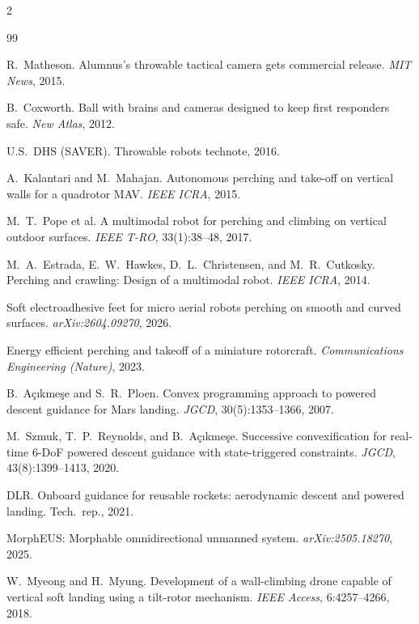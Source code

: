 \documentclass[11pt]{article}
\begin{document}
\scriptsize
\begin{multicols}{2}
\begin{thebibliography}{99}
\setlength\itemsep{-2pt}
\setlength\parskip{0pt}

 R.~Matheson. Alumnus's throwable tactical camera gets commercial release. \emph{MIT News}, 2015.

 B.~Coxworth. Ball with brains and cameras designed to keep first responders safe. \emph{New Atlas}, 2012.

 U.S.\ DHS (SAVER). Throwable robots technote, 2016.

 A.~Kalantari and M.~Mahajan. Autonomous perching and take-off on vertical walls for a quadrotor MAV. \emph{IEEE ICRA}, 2015.

 M.~T.~Pope et al. A multimodal robot for perching and climbing on vertical outdoor surfaces. \emph{IEEE T-RO}, 33(1):38--48, 2017.

 M.~A.~Estrada, E.~W.~Hawkes, D.~L.~Christensen, and M.~R.~Cutkosky. Perching and crawling: Design of a multimodal robot. \emph{IEEE ICRA}, 2014.

 Soft electroadhesive feet for micro aerial robots perching on smooth and curved surfaces. \emph{arXiv:2604.09270}, 2026.

 Energy efficient perching and takeoff of a miniature rotorcraft. \emph{Communications Engineering (Nature)}, 2023.

 B.~A\c{c}{\i}kme\c{s}e and S.~R.~Ploen. Convex programming approach to powered descent guidance for Mars landing. \emph{JGCD}, 30(5):1353--1366, 2007.

 M.~Szmuk, T.~P.~Reynolds, and B.~A\c{c}{\i}kme\c{s}e. Successive convexification for real-time 6-DoF powered descent guidance with state-triggered constraints. \emph{JGCD}, 43(8):1399--1413, 2020.

 DLR. Onboard guidance for reusable rockets: aerodynamic descent and powered landing. Tech.\ rep., 2021.

 MorphEUS: Morphable omnidirectional unmanned system. \emph{arXiv:2505.18270}, 2025.

 W.~Myeong and H.~Myung. Development of a wall-climbing drone capable of vertical soft landing using a tilt-rotor mechanism. \emph{IEEE Access}, 6:4257--4266, 2018.


\end{thebibliography}
\end{multicols}
\end{document}
